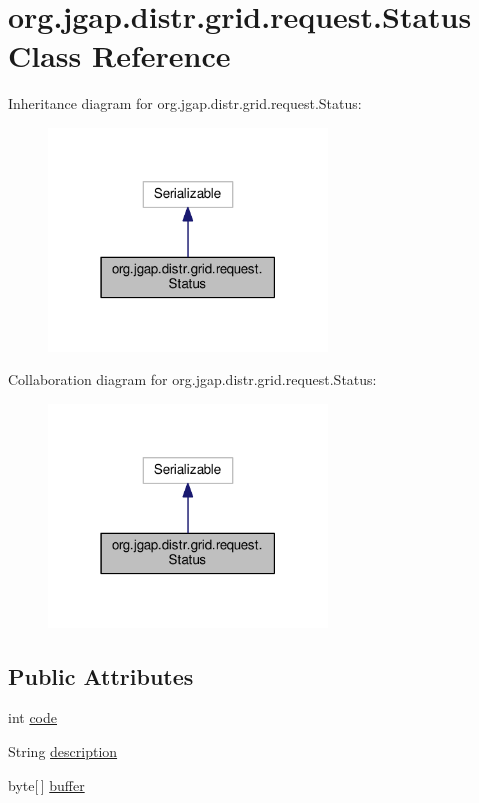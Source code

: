 \hypertarget{classorg_1_1jgap_1_1distr_1_1grid_1_1request_1_1_status}{\section{org.\-jgap.\-distr.\-grid.\-request.\-Status Class Reference}
\label{classorg_1_1jgap_1_1distr_1_1grid_1_1request_1_1_status}
}


Inheritance diagram for org.\-jgap.\-distr.\-grid.\-request.\-Status\-:
\nopagebreak
\begin{figure}[H]
\begin{center}
\leavevmode
\includegraphics[width=210pt]{classorg_1_1jgap_1_1distr_1_1grid_1_1request_1_1_status__inherit__graph}
\end{center}
\end{figure}


Collaboration diagram for org.\-jgap.\-distr.\-grid.\-request.\-Status\-:
\nopagebreak
\begin{figure}[H]
\begin{center}
\leavevmode
\includegraphics[width=210pt]{classorg_1_1jgap_1_1distr_1_1grid_1_1request_1_1_status__coll__graph}
\end{center}
\end{figure}
\subsection*{Public Attributes}
\begin{DoxyCompactItemize}
\item 
int \hyperlink{classorg_1_1jgap_1_1distr_1_1grid_1_1request_1_1_status_a87e194357e88627d286d9aa8a31550b3}{code}
\item 
String \hyperlink{classorg_1_1jgap_1_1distr_1_1grid_1_1request_1_1_status_a8752c218f355df6f52f390c48eefc68c}{description}
\item 
byte\mbox{[}$\,$\mbox{]} \hyperlink{classorg_1_1jgap_1_1distr_1_1grid_1_1request_1_1_status_a74da1624d44f3fca0d2abce45147aa22}{buffer}
\end{DoxyCompactItemize}
